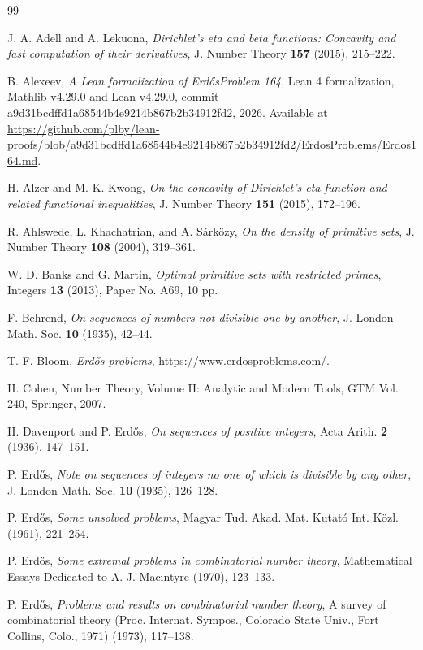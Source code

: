 \documentclass[12pt]{amsart}
\theoremstyle{definition}
\theoremstyle{remark}
\numberwithin{equation}{section}
\newcommand{\1}{{\mathbf 1}}
\newcommand{\Erdos}{{Erd\H{o}s}}
\begin{document}

\begin{thebibliography}{99}

J. A. Adell and A. Lekuona,
\emph{Dirichlet's eta and beta functions: Concavity and fast computation of their derivatives},
J. Number Theory \textbf{157} (2015), 215--222.

B. Alexeev,
\textit{A Lean formalization of \Erdos Problem 164},
Lean 4 formalization, Mathlib v4.29.0 and Lean v4.29.0,
commit a9d31bcdffd1a68544b4e9214b867b2b34912fd2, 2026.
Available at
\url{https://github.com/plby/lean-proofs/blob/a9d31bcdffd1a68544b4e9214b867b2b34912fd2/ErdosProblems/Erdos164.md}.

H. Alzer and M. K. Kwong,
\emph{On the concavity of Dirichlet's eta function and related functional inequalities},
J. Number Theory \textbf{151} (2015), 172--196.

R. Ahlswede, L. Khachatrian, and A. S\'ark\"ozy,
\emph{On the density of primitive sets},
J. Number Theory \textbf{108} (2004), 319--361.

W. D. Banks and G. Martin,
\emph{Optimal primitive sets with restricted primes},
Integers \textbf{13} (2013), Paper No. A69, 10 pp.

F. Behrend,
\emph{On sequences of numbers not divisible one by another},
J. London Math. Soc. \textbf{10} (1935), 42--44.

T. F. Bloom,
\emph{\Erdos{} problems},
\url{https://www.erdosproblems.com/}.

H. Cohen, Number Theory, Volume II: Analytic and Modern Tools, GTM Vol. 240, Springer, 2007.

H. Davenport and P. \Erdos{},
\emph{On sequences of positive integers},
Acta Arith. \textbf{2} (1936), 147--151.

P. \Erdos{},
\emph{Note on sequences of integers no one of which is divisible by any other},
J. London Math. Soc. \textbf{10} (1935), 126--128.

P. \Erdos{},
\emph{Some unsolved problems}, Magyar Tud. Akad. Mat. Kutat\'o Int. K\"ozl. (1961), 221--254.

P. \Erdos{},
\emph{Some extremal problems in combinatorial number theory}, Mathematical Essays Dedicated to A. J. Macintyre (1970), 123--133.

P. \Erdos{},
\emph{Problems and results on combinatorial number theory}, A survey of combinatorial theory (Proc. Internat. Sympos., Colorado State Univ., Fort Collins, Colo., 1971) (1973), 117--138.


\end{thebibliography}
\end{document}
